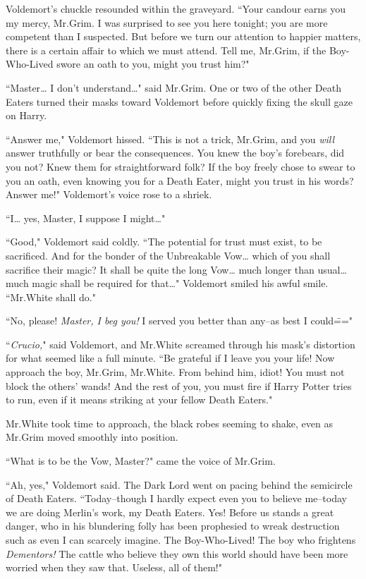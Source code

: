 Voldemort's chuckle resounded within the graveyard. ``Your candour earns you my mercy, Mr.\?Grim. I was surprised to see you here tonight; you are more competent than I suspected. But before we turn our attention to happier matters, there is a certain affair to which we must attend. Tell me, Mr.\?Grim, if the Boy-Who-Lived swore an oath to you, might you trust him?"

``Master{\ldots} I don't understand{\ldots}" said Mr.\?Grim. One or two of the other Death Eaters turned their masks toward Voldemort before quickly fixing the skull gaze on Harry.

``Answer me," Voldemort hissed. ``This is not a trick, Mr.\?Grim, and you \emph{will} answer truthfully or bear the consequences. You knew the boy's forebears, did you not? Knew them for straightforward folk? If the boy freely chose to swear to you an oath, even knowing you for a Death Eater, might you trust in his words? Answer me!" Voldemort's voice rose to a shriek.

``I{\ldots} yes, Master, I suppose I might{\ldots}"

``Good," Voldemort said coldly. ``The potential for trust must exist, to be sacrificed. And for the bonder of the Unbreakable Vow{\ldots} which of you shall sacrifice their magic? It shall be quite the long Vow{\ldots} much longer than usual{\ldots} much magic shall be required for that{\ldots}" Voldemort smiled his awful smile. ``Mr.\?White shall do."

``No, please! \emph{Master, I beg you!} I served you better than any\---as best I could\==="

``\emph{Crucio,}" said Voldemort, and Mr.\?White screamed through his mask's distortion for what seemed like a full minute. ``Be grateful if I leave you your life! Now approach the boy, Mr.\?Grim, Mr.\?White. From behind him, idiot! You must not block the others' wands! And the rest of you, you must fire if Harry Potter tries to run, even if it means striking at your fellow Death Eaters."

Mr.\?White took time to approach, the black robes seeming to shake, even as Mr.\?Grim moved smoothly into position.

``What is to be the Vow, Master?" came the voice of Mr.\?Grim.

``Ah, yes," Voldemort said. The Dark Lord went on pacing behind the semicircle of Death Eaters. ``Today\---though I hardly expect even you to believe me\---today we are doing Merlin's work, my Death Eaters. Yes! Before us stands a great danger, who in his blundering folly has been prophesied to wreak destruction such as even I can scarcely imagine. The Boy-Who-Lived! The boy who frightens \emph{Dementors!} The cattle who believe they own this world should have been more worried when they saw that. Useless, all of them!"

